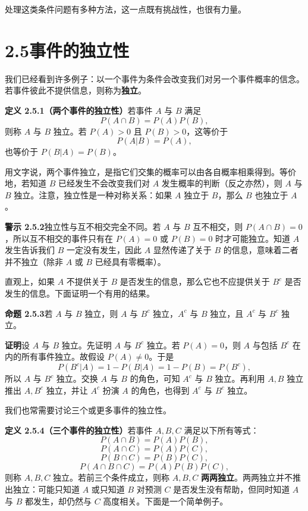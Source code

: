 \documentclass[UTF8,12pt,a4paper,fontset=fandol]{ctexart}
\begin{document}
处理这类条件问题有多种方法，这一点既有挑战性，也很有力量。

\section*{2.5\quad 事件的独立性}

我们已经看到许多例子：以一个事件为条件会改变我们对另一个事件概率的信念。若事件彼此不提供信息，则称为\textbf{独立}。

\noindent\textbf{定义 2.5.1（两个事件的独立性）}\quad 若事件 $A$ 与 $B$ 满足
\[
  P(A\cap B)=P(A)P(B),
\]
则称 $A$ 与 $B$ 独立。若 $P(A)>0$ 且 $P(B)>0$，这等价于
\[
  P(A|B)=P(A),
\]
也等价于 $P(B|A)=P(B)$。

用文字说，两个事件独立，是指它们交集的概率可以由各自概率相乘得到。等价地，若知道 $B$ 已经发生不会改变我们对 $A$ 发生概率的判断（反之亦然），则 $A$ 与 $B$ 独立。注意，独立性是一种对称关系：如果 $A$ 独立于 $B$，那么 $B$ 也独立于 $A$。

\noindent\textbf{警示 2.5.2}\quad 独立性与互不相交完全不同。若 $A$ 与 $B$ 互不相交，则 $P(A\cap B)=0$，所以互不相交的事件只有在 $P(A)=0$ 或 $P(B)=0$ 时才可能独立。知道 $A$ 发生告诉我们 $B$ 一定没有发生，因此 $A$ 显然传递了关于 $B$ 的信息，意味着二者并不独立（除非 $A$ 或 $B$ 已经具有零概率）。

直观上，如果 $A$ 不提供关于 $B$ 是否发生的信息，那么它也不应提供关于 $B^c$ 是否发生的信息。下面证明一个有用的结果。

\noindent\textbf{命题 2.5.3}\quad 若 $A$ 与 $B$ 独立，则 $A$ 与 $B^c$ 独立，$A^c$ 与 $B$ 独立，且 $A^c$ 与 $B^c$ 独立。

\noindent\textbf{证明}\quad 设 $A$ 与 $B$ 独立。先证明 $A$ 与 $B^c$ 独立。若 $P(A)=0$，则 $A$ 与包括 $B^c$ 在内的所有事件独立。故假设 $P(A)\ne 0$。于是
\[
  P(B^c|A)=1-P(B|A)=1-P(B)=P(B^c),
\]
所以 $A$ 与 $B^c$ 独立。交换 $A$ 与 $B$ 的角色，可知 $A^c$ 与 $B$ 独立。再利用 $A,B$ 独立推出 $A,B^c$ 独立，并让 $A^c$ 扮演 $A$ 的角色，也得到 $A^c$ 与 $B^c$ 独立。

我们也常需要讨论三个或更多事件的独立性。

\noindent\textbf{定义 2.5.4（三个事件的独立性）}\quad 若事件 $A,B,C$ 满足以下所有等式：
\[
  P(A\cap B)=P(A)P(B),
\]
\[
  P(A\cap C)=P(A)P(C),
\]
\[
  P(B\cap C)=P(B)P(C),
\]
\[
  P(A\cap B\cap C)=P(A)P(B)P(C),
\]
则称 $A,B,C$ 独立。若前三个条件成立，则称 $A,B,C$ \textbf{两两独立}。两两独立并不推出独立：可能只知道 $A$ 或只知道 $B$ 对预测 $C$ 是否发生没有帮助，但同时知道 $A$ 与 $B$ 都发生，却仍然与 $C$ 高度相关。下面是一个简单例子。
\end{document}
